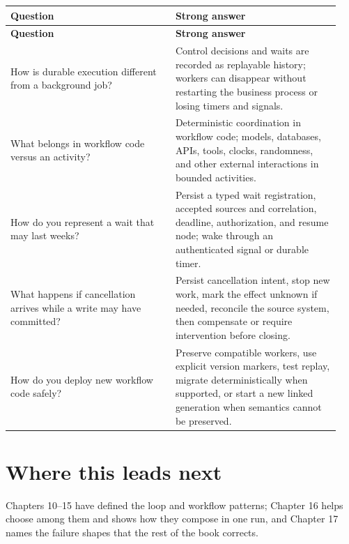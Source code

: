 \BookTableStart
\small
\begin{longtable}{@{}Y{0.4700\linewidth}Y{0.4700\linewidth}@{}}
\color{white}\bfseries \textbf{Question} & \color{white}\bfseries \textbf{Strong answer} \\
\endfirsthead
{}
\color{white}\bfseries \textbf{Question} & \color{white}\bfseries \textbf{Strong answer} \\
\endhead
How is durable execution different from a background job? & Control decisions and waits are recorded as replayable history; workers can disappear without restarting the business process or losing timers and signals. \\
What belongs in workflow code versus an activity? & Deterministic coordination in workflow code; models, databases, APIs, tools, clocks, randomness, and other external interactions in bounded activities. \\
How do you represent a wait that may last weeks? & Persist a typed wait registration, accepted sources and correlation, deadline, authorization, and resume node; wake through an authenticated signal or durable timer. \\
What happens if cancellation arrives while a write may have committed? & Persist cancellation intent, stop new work, mark the effect unknown if needed, reconcile the source system, then compensate or require intervention before closing. \\
How do you deploy new workflow code safely? & Preserve compatible workers, use explicit version markers, test replay, migrate deterministically when supported, or start a new linked generation when semantics cannot be preserved. \\
\end{longtable}
\BookTableEnd

\section{Where this leads next}

Chapters 10–15 have defined the loop and workflow patterns; Chapter 16 helps choose among them and shows how they compose in one run, and Chapter 17 names the failure shapes that the rest of the book corrects.\par


